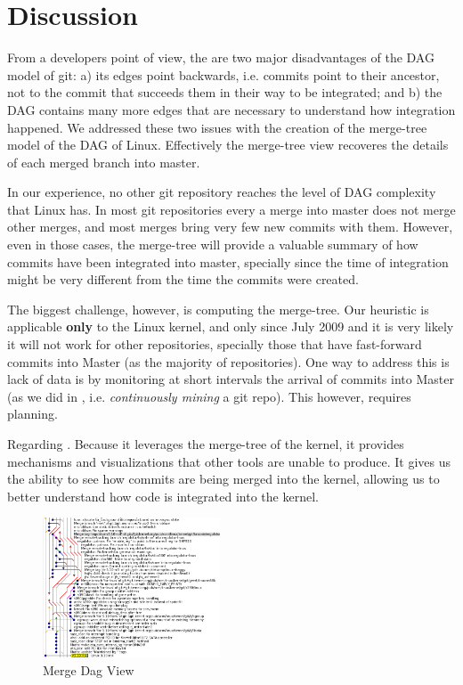 \documentclass[conference, draftclsnofoot, draft]{IEEEtran}
\begin{document}
\section{Discussion}

From a developers point of view, the are two major disadvantages of the DAG model of git: a) its edges point backwards, i.e. commits point to their ancestor,
not to the commit that succeeds them in their way to be integrated; and b) the DAG contains many more edges that are necessary to understand how integration
happened. We addressed these two issues with the creation of the merge-tree model of the DAG of Linux. Effectively the merge-tree view recoveres the details of each merged
branch into master.

In our experience, no other git repository reaches the level of DAG complexity that Linux has. In most git repositories  every a merge into master does not
merge other merges, and most merges bring very few new commits with them. However, even in those cases, the merge-tree will provide a valuable summary of how
commits have been integrated into master, specially since the time of integration might be very different from the time the commits were created. 

The biggest challenge, however, is computing the merge-tree. Our heuristic is applicable \textbf{only} to the Linux kernel, and only since July 2009 and it is
very likely it will not work for other repositories, specially those that have fast-forward commits into Master (as the majority of repositories). One way to
address this is lack of data is by monitoring at short intervals the arrival of commits into Master (as we did in \cite{German2015}, i.e.
\emph{continuously mining} a git repo). This however, requires planning.

Regarding \tool. Because it leverages the merge-tree of the kernel, it provides mechanisms and visualizations that other tools are unable to
produce.  It gives us the ability to see how commits are being merged
into the kernel, allowing us to better understand how code is integrated into the kernel.

\begin{figure}
        \centering
        \includegraphics[width=0.47\textwidth]{figures/042dd_DAG.png}
        \caption{Merge Dag View}
        \label{fig:dag_view}
\end{figure}
\end{document}
